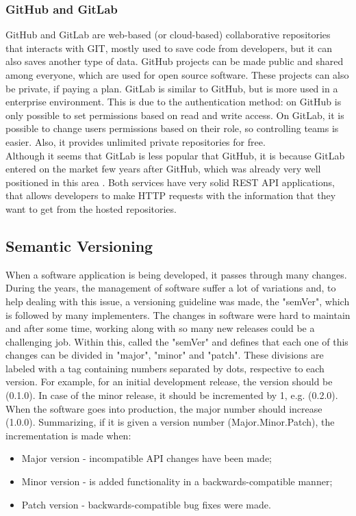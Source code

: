 \documentclass[mim_thesis.tex]{subfiles}
\begin{document}
\newpage
\subsubsection{GitHub and GitLab}

GitHub and GitLab are web-based (or cloud-based) collaborative repositories that interacts with GIT, mostly used to save code from developers, but it can also saves another type of data. GitHub projects can be made public and shared among everyone, which are used for open source software. These projects can also be private, if paying a plan. GitLab is similar to GitHub, but is more used in a enterprise environment. This is due to the authentication method: on GitHub is only possible to set permissions based on read and write access. On GitLab, it is possible to change users permissions based on their role, so controlling teams is easier. Also, it provides unlimited private repositories for free. \\

Although it seems that GitLab is less popular that GitHub, it is because GitLab entered on the market few years after GitHub, which was already very well positioned in this area \citep{thomas2017git}. Both services have very solid REST API applications, that allows developers to make HTTP requests with the information that they want to get from the hosted repositories. 


\subsection{Semantic Versioning}
When a software application is being developed, it passes through many changes. During the years, the management of software suffer a lot of variations and, to help dealing with this issue, a versioning guideline was made, the "semVer", which is followed by many implementers. The changes in software were hard to maintain and after some time, working along with so many new releases could be a challenging job. Within this, called the "semVer" and defines that each one of this changes can be divided in "major", "minor" and "patch". These divisions are labeled with a tag containing numbers separated by dots, respective to each version. For example, for an initial development release, the version should be (0.1.0). In case of the minor release, it should be incremented by 1, e.g. (0.2.0). When the software goes into production, the major number should increase (1.0.0). Summarizing, if it is given a version number (Major.Minor.Patch), the incrementation is made when: \citep{preston2018}
\begin{itemize} [noitemsep]
\item Major version - incompatible API changes have been made;
\item Minor version - is added functionality in a backwards-compatible manner;
\item Patch version - backwards-compatible bug fixes were made.
\end{itemize}
\end{document}
